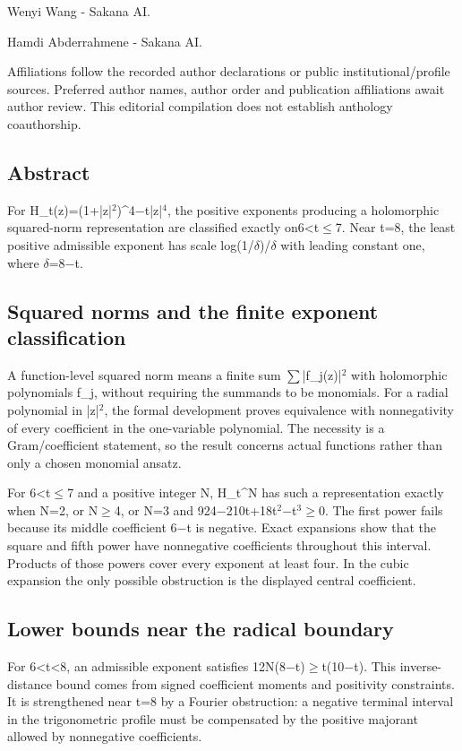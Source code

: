 \documentclass[11pt,a4paper]{article}
\begin{document}
{\small Wenyi Wang  -  Sakana AI.\par}

{\small Hamdi Abderrahmene  -  Sakana AI.\par}

{\small Affiliations follow the recorded author declarations or public institutional/profile sources. Preferred author names, author order and publication affiliations await author review. This editorial compilation does not establish anthology coauthorship.\par}

\subsection{Abstract}
For H\_t(z)=(1+|z|\ensuremath{^2})\textasciicircum{}4\ensuremath{-}t|z|\ensuremath{^4}, the positive exponents producing a holomorphic squared-norm representation are classified exactly on6<t\ensuremath{\leq}7. Near t=8, the least positive admissible exponent has scale log(1/\ensuremath{\delta})/\ensuremath{\delta} with leading constant one, where \ensuremath{\delta}=8\ensuremath{-}t.

\subsection{Squared norms and the finite exponent classification}
A function-level squared norm means a finite sum \ensuremath{\sum}|f\_j(z)|\ensuremath{^2} with holomorphic polynomials f\_j, without requiring the summands to be monomials. For a radial polynomial in |z|\ensuremath{^2}, the formal development proves equivalence with nonnegativity of every coefficient in the one-variable polynomial. The necessity is a Gram/coefficient statement, so the result concerns actual functions rather than only a chosen monomial ansatz.

For 6<t\ensuremath{\leq}7 and a positive integer N, H\_t\textasciicircum{}N has such a representation exactly when N=2, or N\ensuremath{\geq}4, or N=3 and 924\ensuremath{-}210t+18t\ensuremath{^2}\ensuremath{-}t\ensuremath{^3}\ensuremath{\geq}0. The first power fails because its middle coefficient 6\ensuremath{-}t is negative. Exact expansions show that the square and fifth power have nonnegative coefficients throughout this interval. Products of those powers cover every exponent at least four. In the cubic expansion the only possible obstruction is the displayed central coefficient.

\subsection{Lower bounds near the radical boundary}
For 6<t<8, an admissible exponent satisfies 12N(8\ensuremath{-}t)\ensuremath{\geq}t(10\ensuremath{-}t). This inverse-distance bound comes from signed coefficient moments and positivity constraints. It is strengthened near t=8 by a Fourier obstruction: a negative terminal interval in the trigonometric profile must be compensated by the positive majorant allowed by nonnegative coefficients.
\end{document}
